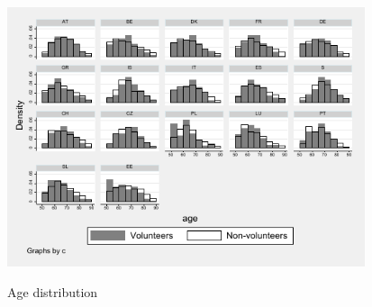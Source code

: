 \documentclass[10pt, letterpaper]{article}
\begin{document}
\begin{spacing}{1.4}
\begin{spacing}{.9}
\begin{spacing}{.9}
	 
      \label{KendallCasp} 
\end{spacing}




 
\begin{spacing}{.9}
\centering 
\begin{tiny} 
	 
      \label{DescT0} 
\end{tiny}
\end{spacing}

\begin{figure}[H]
 \includegraphics[height=3in]{hist_age.pdf}
 \centering
 \label{fig:hist_age}
\caption{Age distribution}
\end{figure}


\begin{spacing}{.9}
\centering 
\begin{scriptsize} 
	 
      \label{StatEdu} 
\end{scriptsize}
\end{spacing}


\begin{spacing}{.9}
\centering 
\begin{scriptsize} 
	 
      \label{StatHealth} 
\end{scriptsize}
\end{spacing}

\begin{spacing}{.9}
\centering 
\begin{scriptsize} 
	 
      \label{DescT1} 
\end{scriptsize}
\end{spacing}


\end{spacing}
\end{spacing}
\end{document}

